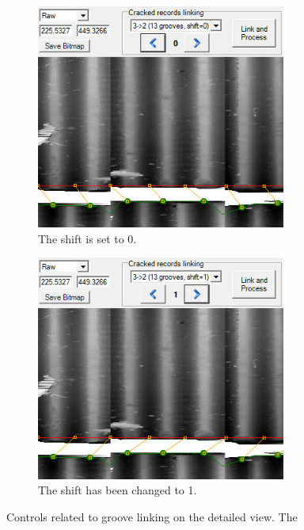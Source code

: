 \begin{figure}[!ht]
\centering
    \begin{subfigure}[t]{0.45\textwidth}
    \centering
    \includegraphics[width=0.9\textwidth]{images/auto-det-controls-1}
    \caption{The shift is set to 0.}
    \label{fig:autodetcontrols1}
    \end{subfigure}
    \begin{subfigure}[t]{0.45\textwidth}
    \centering
    \includegraphics[width=0.9\textwidth]{images/auto-det-controls-2}
    \caption{The shift has been changed to 1.}
    \label{fig:autodetcontrols2}
    \end{subfigure}
    \caption{Controls related to groove linking on the detailed view. The }
    \label{fig:autodetcontrols}
\end{figure}

